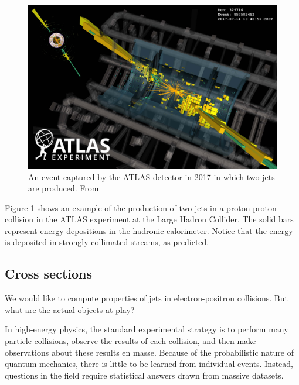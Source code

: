 \documentclass[../thesis.tex]{subfiles}
\begin{document}
	\begin{figure}
	\begin{center}
		\includegraphics[width=\textwidth]{figures/DijetHighMass9.3TeV-VP1-nocone_small.jpg}
		\caption{\label{technical-fig:dijet}An event captured by the ATLAS detector in 2017 in which two jets are produced. From \cite{atlas_collaboration_event_nodate}}
	\end{center}
	\end{figure}

	Figure \ref{technical-fig:dijet} shows an example of the production of two jets in a proton-proton collision in the ATLAS experiment at the Large Hadron Collider. The solid bars represent energy depositions in the hadronic calorimeter. Notice that the energy is deposited in strongly collimated streams, as predicted.

\subsection{Cross sections}
	We would like to compute properties of jets in electron-positron collisions. But what are the actual objects at play?

	In high-energy physics, the standard experimental strategy is to perform many particle collisions, observe the results of each collision, and then make observations about these results en masse. Because of the probabilistic nature of quantum mechanics, there is little to be learned from individual events. Instead, questions in the field require statistical answers drawn from massive datasets.
\end{document}
